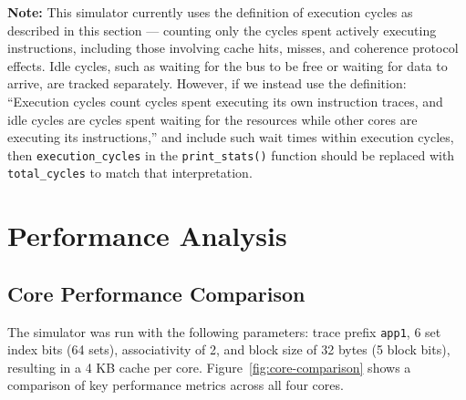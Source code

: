 \documentclass[a4paper,12pt]{article}
\begin{document}
\begin{itemize}
    
    \noindent \textbf{Note:} This simulator currently uses the definition of execution cycles as described in this section — counting only the cycles spent actively executing instructions, including those involving cache hits, misses, and coherence protocol effects. Idle cycles, such as waiting for the bus to be free or waiting for data to arrive, are tracked separately. However, if we instead use the definition: “Execution cycles count cycles spent executing its own instruction traces, and idle cycles are cycles spent waiting for the resources while other cores are executing its instructions,” and include such wait times within execution cycles, then \texttt{execution\_cycles} in the \texttt{print\_stats()} function should be replaced with \texttt{total\_cycles} to match that interpretation.

\end{itemize}


\section{Performance Analysis}

\subsection{Core Performance Comparison}

The simulator was run with the following parameters: trace prefix \texttt{app1}, 6 set index bits (64 sets), associativity of 2, and block size of 32 bytes (5 block bits), resulting in a 4 KB cache per core. Figure~\ref{fig:core-comparison} shows a comparison of key performance metrics across all four cores.
\end{document}
